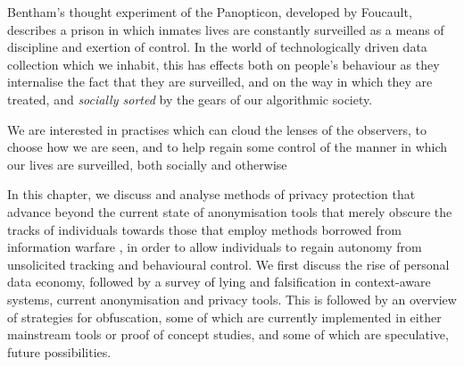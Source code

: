 \documentclass{IOS-Book-Article}     %
\begin{document}


Bentham's thought experiment of the Panopticon, developed by Foucault, describes
a prison in which inmates lives are constantly surveilled as a means of
discipline and exertion of control.  In the world of technologically driven 
data collection which we inhabit, this has effects both on people's behaviour as
they internalise the fact that they are surveilled, and on the way in which they
are treated, and \emph{socially sorted} by the gears of our algorithmic
society\cite{simon2005Panopticism}.

We are interested in practises which can cloud the lenses of the observers, to
choose how we are seen, and to help regain some control of
the manner in which our lives are surveilled, both socially and otherwise

In this chapter, we discuss and analyse methods of privacy protection that
advance beyond the current state of anonymisation tools that merely obscure the tracks
of individuals towards those that employ methods borrowed from
information warfare \cite{gursestranslating,lyon2007surveillance}, in order to allow individuals to regain autonomy
from unsolicited tracking and behavioural control.  We first discuss the rise of 
personal data economy, followed by a survey of lying and falsification in context-aware 
systems, current anonymisation and privacy tools. This is followed by an overview of
strategies for obfuscation, some of which are currently implemented in either
mainstream tools or proof of concept studies,  and some of which are
speculative, future possibilities.
\end{document}
